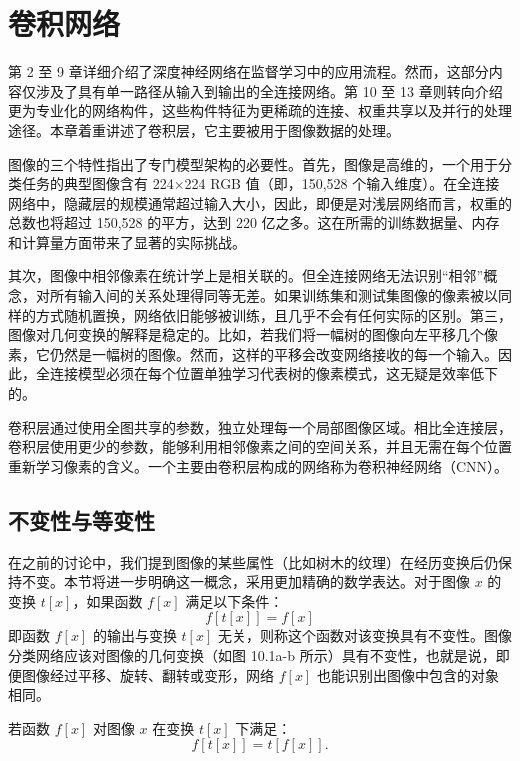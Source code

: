 \chapter{卷积网络}

第 2 至 9 章详细介绍了深度神经网络在监督学习中的应用流程。然而，这部分内容仅涉及了具有单一路径从输入到输出的全连接网络。第 10 至 13 章则转向介绍更为专业化的网络构件，这些构件特征为更稀疏的连接、权重共享以及并行的处理途径。本章着重讲述了卷积层，它主要被用于图像数据的处理。

图像的三个特性指出了专门模型架构的必要性。首先，图像是高维的，一个用于分类任务的典型图像含有 224×224 RGB 值（即，150,528 个输入维度）。在全连接网络中，隐藏层的规模通常超过输入大小，因此，即便是对浅层网络而言，权重的总数也将超过 150,528 的平方，达到 220 亿之多。这在所需的训练数据量、内存和计算量方面带来了显著的实际挑战。

其次，图像中相邻像素在统计学上是相关联的。但全连接网络无法识别“相邻”概念，对所有输入间的关系处理得同等无差。如果训练集和测试集图像的像素被以同样的方式随机置换，网络依旧能够被训练，且几乎不会有任何实际的区别。第三，图像对几何变换的解释是稳定的。比如，若我们将一幅树的图像向左平移几个像素，它仍然是一幅树的图像。然而，这样的平移会改变网络接收的每一个输入。因此，全连接模型必须在每个位置单独学习代表树的像素模式，这无疑是效率低下的。

卷积层通过使用全图共享的参数，独立处理每一个局部图像区域。相比全连接层，卷积层使用更少的参数，能够利用相邻像素之间的空间关系，并且无需在每个位置重新学习像素的含义。一个主要由卷积层构成的网络称为卷积神经网络（CNN）。

\section{不变性与等变性}
在之前的讨论中，我们提到图像的某些属性（比如树木的纹理）在经历变换后仍保持不变。本节将进一步明确这一概念，采用更加精确的数学表达。对于图像 \(x\) 的变换 \(t[x]\)，如果函数 \(f[x]\) 满足以下条件：
\begin{equation}
f[t[x]] = f[x] 
\end{equation}
即函数 \(f[x]\) 的输出与变换 \(t[x]\) 无关，则称这个函数对该变换具有不变性。图像分类网络应该对图像的几何变换（如图 10.1a-b 所示）具有不变性，也就是说，即便图像经过平移、旋转、翻转或变形，网络 \(f[x]\) 也能识别出图像中包含的对象相同。

若函数 \(f[x]\) 对图像 \(x\) 在变换 \(t[x]\) 下满足：
\begin{equation}
f[t[x]] = t[f[x]]. 
\end{equation}

